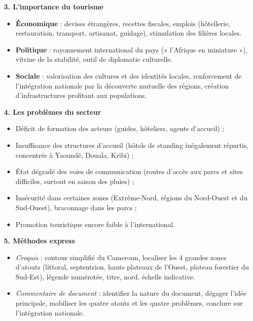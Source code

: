 \documentclass[11pt]{article}
\newcommand{\cle}[1]{{\popxbold\color{popdark}#1}}
\begin{document}
\begin{aretenir}
\textbf{3. L'importance du tourisme}
\begin{itemize}
  \item \textbf{Économique} : devises étrangères, recettes fiscales, emplois (hôtellerie, restauration, transport, artisanat, guidage), stimulation des filières locales.
  \item \textbf{Politique} : rayonnement international du pays (« l'Afrique en miniature »), vitrine de la stabilité, outil de diplomatie culturelle.
  \item \textbf{Sociale} : valorisation des cultures et des identités locales, renforcement de l'\cle{intégration nationale} par la découverte mutuelle des régions, création d'infrastructures profitant aux populations.
\end{itemize}

\textbf{4. Les problèmes du secteur}
\begin{itemize}
  \item Déficit de \cle{formation} des acteurs (guides, hôteliers, agents d'accueil) ;
  \item Insuffisance des \cle{structures d'accueil} (hôtels de standing inégalement répartis, concentrés à Yaoundé, Douala, Kribi) ;
  \item État dégradé des \cle{voies de communication} (routes d'accès aux parcs et sites difficiles, surtout en saison des pluies) ;
  \item \cle{Insécurité} dans certaines zones (Extrême-Nord, régions du Nord-Ouest et du Sud-Ouest), braconnage dans les parcs ;
  \item Promotion touristique encore faible à l'international.
\end{itemize}

\textbf{5. Méthodes express}
\begin{itemize}
  \item \emph{Croquis} : contour simplifié du Cameroun, localiser les 4 grandes zones d'atouts (littoral, septentrion, hauts plateaux de l'Ouest, plateau forestier du Sud-Est), légende numérotée, titre, nord, échelle indicative.
  \item \emph{Commentaire de document} : identifier la nature du document, dégager l'idée principale, mobiliser les quatre atouts et les quatre problèmes, conclure sur l'intégration nationale.
\end{itemize}
\end{aretenir}
\end{document}
